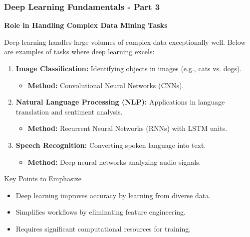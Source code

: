 \documentclass[aspectratio=169]{beamer}
\begin{document}
\begin{frame}[fragile]
    \frametitle{Deep Learning Fundamentals - Part 3}
    \textbf{Role in Handling Complex Data Mining Tasks}
    
    Deep learning handles large volumes of complex data exceptionally well. Below are examples of tasks where deep learning excels:

    \begin{enumerate}
        \item \textbf{Image Classification:} Identifying objects in images (e.g., cats vs. dogs).
        \begin{itemize}
            \item \textbf{Method:} Convolutional Neural Networks (CNNs).
        \end{itemize}

        \item \textbf{Natural Language Processing (NLP):} Applications in language translation and sentiment analysis.
        \begin{itemize}
            \item \textbf{Method:} Recurrent Neural Networks (RNNs) with LSTM units.
        \end{itemize}

        \item \textbf{Speech Recognition:} Converting spoken language into text.
        \begin{itemize}
            \item \textbf{Method:} Deep neural networks analyzing audio signals.
        \end{itemize}
    \end{enumerate}
    
    \begin{block}{Key Points to Emphasize}
        \begin{itemize}
            \item Deep learning improves accuracy by learning from diverse data.
            \item Simplifies workflows by eliminating feature engineering.
            \item Requires significant computational resources for training.
        \end{itemize}
    \end{block}
\end{frame}
\end{document}
